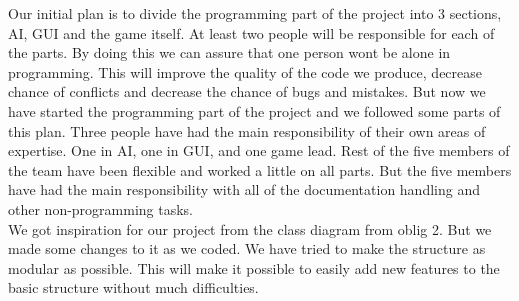 \documentclass{article}
\begin{document}
    \noindent
    Our initial plan is to divide the programming part of the project into 3 sections, AI, GUI and the game itself. At least two people will be responsible for each of the parts. By doing this we can assure that one person wont be alone in programming. This will improve the quality of the code we produce, decrease chance of conflicts and decrease the chance of bugs and mistakes. But now we have started the programming part of the project and we followed some parts of this plan. Three people have had the main responsibility of their own areas of expertise. One in AI, one in GUI, and one game lead. Rest of the five members of the team have been flexible and worked a little on all parts. But the five members have had the main responsibility with all of the documentation handling and other non-programming tasks. \\
    \noindent
    We got inspiration for our project from the class diagram from oblig 2. But we made some changes to it as we coded. We have tried to make the structure as modular as possible. This will make it possible to easily add new features to the basic structure without much difficulties. \\
\end{document}
